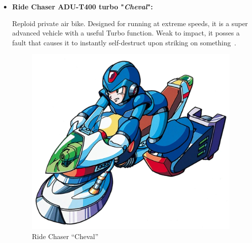 \begin{itemize}
	
	\item \hypertarget{vehicle:Ride_Chaser_Cheval}{\textbf{Ride Chaser ADU-T400 turbo "\textit{Cheval}": }}
	Reploid private air bike. Designed for running at extreme speeds, 
	it is a super advanced vehicle with a useful Turbo function. Weak to impact, it posses  a fault that causes it to instantly self-destruct upon striking on something~\cite{wayback:X2_resources}.
	\begin{figure}[htp]
		\centering
		\includegraphics[height=\portraitsize]{figures/X2/weapons/RCCheval.png}
		\caption{Ride Chaser ``Cheval''}
	\end{figure}
	
	
	
	
\end{itemize}


